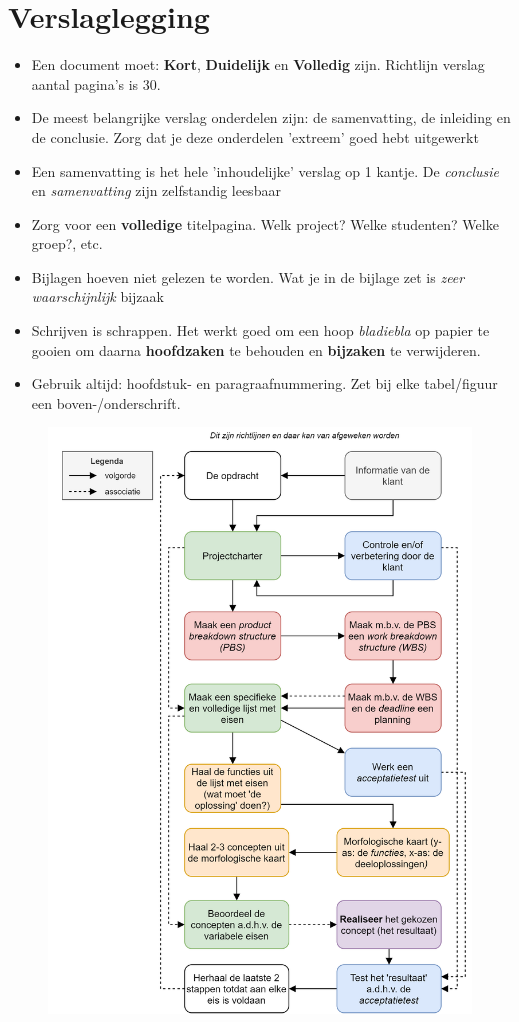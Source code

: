 \documentclass[24pt,a4paper]{article}
\begin{document}
\section{Verslaglegging}
\begin{itemize}
      \mssep
      \item Een document moet: \textbf{Kort}, \textbf{Duidelijk} en \textbf{Volledig} zijn. Richtlijn verslag aantal pagina's is $30$.
      \item De meest belangrijke verslag onderdelen zijn: de samenvatting, de inleiding en de conclusie. Zorg dat je deze onderdelen 'extreem' goed hebt uitgewerkt
      \item Een samenvatting is het hele 'inhoudelijke' verslag op 1 kantje.
            De \textit{conclusie} en \textit{samenvatting} zijn zelfstandig leesbaar
      \item Zorg voor een \textbf{volledige} titelpagina. Welk project? Welke studenten? Welke groep?, etc.
      \item Bijlagen hoeven niet gelezen te worden. Wat je in de bijlage zet is \textit{zeer waarschijnlijk} bijzaak
      \item Schrijven is schrappen. Het werkt goed om een hoop \textit{bladiebla} op papier te gooien om daarna \textbf{hoofdzaken} te behouden en \textbf{bijzaken} te verwijderen.
      \item Gebruik altijd: hoofdstuk- en paragraafnummering. Zet bij elke tabel/figuur een boven-/onderschrift.
\end{itemize}


\newpage

\begin{figure}[tph]
      \centering
      \includegraphics[height=\textheight]{graphics/OntwerpMethodiekMechatronica.png}
\end{figure}
\end{document}
